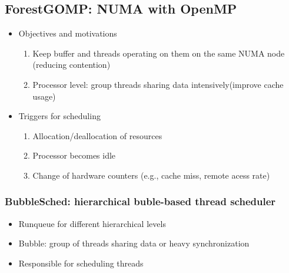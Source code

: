 \documentclass[11pt]{article}
\begin{document}
\subsection{ForestGOMP: NUMA with OpenMP}
\label{sec-2-3}
\begin{itemize}
\item Objectives and motivations
\begin{enumerate}
\item Keep buffer and threads operating on them on the same NUMA node (reducing contention)
\item Processor level: group threads sharing data intensively(improve cache usage)
\end{enumerate}
\item Triggers for scheduling
\begin{enumerate}
\item Allocation/deallocation of resources
\item Processor becomes idle
\item Change of hardware counters (e.g., cache miss, remote acess rate)
\end{enumerate}
\end{itemize}
\subsubsection{BubbleSched: hierarchical buble-based thread scheduler}
\label{sec-2-3-1}
\begin{itemize}
\item Runqueue for different hierarchical levels
\item Bubble: group of threads sharing data or heavy synchronization
\item Responsible for scheduling threads
\end{itemize}
\end{document}
